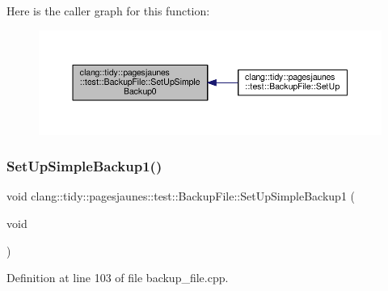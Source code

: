 Here is the caller graph for this function\+:
\nopagebreak
\begin{figure}[H]
\begin{center}
\leavevmode
\includegraphics[width=350pt]{classclang_1_1tidy_1_1pagesjaunes_1_1test_1_1_backup_file_a1c3f8ddd2e12ac89a6a2b43bc269f69c_icgraph}
\end{center}
\end{figure}
\mbox{\label{classclang_1_1tidy_1_1pagesjaunes_1_1test_1_1_backup_file_a20076e5d45d3df60f6417d6cd7e10f66}} 
\subsubsection{\texorpdfstring{Set\+Up\+Simple\+Backup1()}{SetUpSimpleBackup1()}}
{\footnotesize\ttfamily void clang\+::tidy\+::pagesjaunes\+::test\+::\+Backup\+File\+::\+Set\+Up\+Simple\+Backup1 (\begin{DoxyParamCaption}\item[{void}]{ }\end{DoxyParamCaption})\hspace{0.3cm}{\ttfamily [virtual]}}



Definition at line 103 of file backup\+\_\+file.\+cpp.


